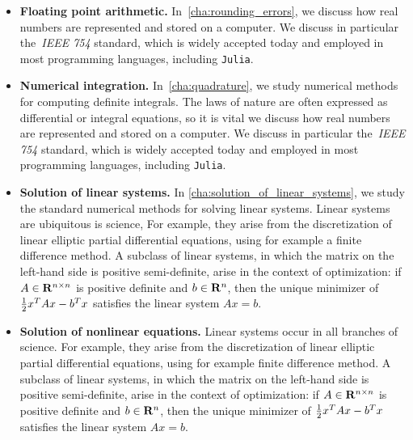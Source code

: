 \begin{itemize}
    \item
        \textbf{Floating point arithmetic.}
        In~\cref{cha:rounding_errors},
        we discuss how real numbers are represented and stored on a computer.
        We discuss in particular the~\emph{IEEE 754} standard, which is widely accepted today
        and employed in most programming languages, including \texttt{Julia}.

    \item
        \textbf{Numerical integration.}
        In~\cref{cha:quadrature},
        we study numerical methods for computing definite integrals.
        The laws of nature are often expressed as differential or integral equations,
        so it is vital 
        we discuss how real numbers are represented and stored on a computer.
        We discuss in particular the~\emph{IEEE 754} standard, which is widely accepted today
        and employed in most programming languages, including \texttt{Julia}.

    \item
        \textbf{Solution of linear systems.}
        In \cref{cha:solution_of_linear_systems},
        we study the standard numerical methods for solving linear systems.
        Linear systems are ubiquitous is science,
        For example, they arise from the discretization of linear elliptic partial differential equations,
        using for example a finite difference method.
        A subclass of linear systems, in which the matrix on the left-hand side is positive semi-definite,
        arise in the context of optimization:
        if $A \in \mathbf R^{n \times n}$ is positive definite and $b \in \mathbf R^n$,
        then the unique minimizer of $\frac{1}{2} x^T A x - b^T x$ satisfies the linear system $A x = b$.

    \item
        \textbf{Solution of nonlinear equations.}
        Linear systems occur in all branches of science.
        For example, they arise from the discretization of linear elliptic partial differential equations,
        using for example finite difference method.
        A subclass of linear systems, in which the matrix on the left-hand side is positive semi-definite,
        arise in the context of optimization:
        if $A \in \mathbf R^{n \times n}$ is positive definite and $b \in \mathbf R^n$,
        then the unique minimizer of $\frac{1}{2} x^T A x - b^T x$ satisfies the linear system $A x = b$.
\end{itemize}
